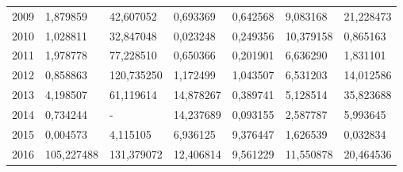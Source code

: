 \begin{table}
\begin{tabular}{p{1cm}p{2cm}p{2cm}p{2cm}p{2cm}p{2cm}p{2cm}}
 2009 &                         1,879859 &                 42,607052 &               0,693369 &                                0,642568 &                                   9,083168 &                      21,228473 \\
 2010 &                         1,028811 &                 32,847048 &               0,023248 &                                0,249356 &                                  10,379158 &                       0,865163 \\
 2011 &                         1,978778 &                 77,228510 &               0,650366 &                                0,201901 &                                   6,636290 &                       1,831101 \\
 2012 &                         0,858863 &                120,735250 &               1,172499 &                                1,043507 &                                   6,531203 &                      14,012586 \\
 2013 &                         4,198507 &                 61,119614 &              14,878267 &                                0,389741 &                                   5,128514 &                      35,823688 \\
 2014 &                         0,734244 &                         - &              14,237689 &                                0,093155 &                                   2,587787 &                       5,993645 \\
 2015 &                         0,004573 &                  4,115105 &               6,936125 &                                9,376447 &                                   1,626539 &                       0,032834 \\
 2016 &                       105,227488 &                131,379072 &              12,406814 &                                9,561229 &                                  11,550878 &                      20,464536 \\
\bottomrule
\end{tabular}
\end{table}

